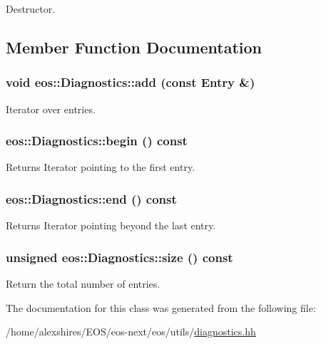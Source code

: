 Destructor. 

\subsection{Member Function Documentation}
\hypertarget{classeos_1_1Diagnostics_a1c1e295724886603c8842e278ab62bbc}{
\subsubsection[{add}]{\setlength{\rightskip}{0pt plus 5cm}void eos::Diagnostics::add (const {\bf Entry} \&)}}
\label{classeos_1_1Diagnostics_a1c1e295724886603c8842e278ab62bbc}


Iterator over entries. \hypertarget{classeos_1_1Diagnostics_a98edcfc773cbdf2384b6180cd1a8aebc}{
\subsubsection[{begin}]{ eos::Diagnostics::begin () const}}
\label{classeos_1_1Diagnostics_a98edcfc773cbdf2384b6180cd1a8aebc}


Returns Iterator pointing to the first entry. \hypertarget{classeos_1_1Diagnostics_a0e10cf2a79180f04b2d5c5100447ddb4}{
\subsubsection[{end}]{ eos::Diagnostics::end () const}}
\label{classeos_1_1Diagnostics_a0e10cf2a79180f04b2d5c5100447ddb4}


Returns Iterator pointing beyond the last entry. \hypertarget{classeos_1_1Diagnostics_a791a35a96b5661232ca9797e7a48c5e8}{
\subsubsection[{size}]{\setlength{\rightskip}{0pt plus 5cm}unsigned eos::Diagnostics::size () const}}
\label{classeos_1_1Diagnostics_a791a35a96b5661232ca9797e7a48c5e8}


Return the total number of entries. 

The documentation for this class was generated from the following file:\begin{DoxyCompactItemize}
\item 
/home/alexshires/EOS/eos-\/next/eos/utils/\hyperlink{diagnostics_8hh}{diagnostics.hh}\end{DoxyCompactItemize}
